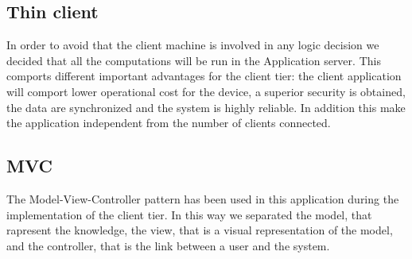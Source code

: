\subsection{Thin client}
	In order to avoid that the client machine is involved in any logic decision we decided that all the computations will be run in the Application server. This comports different important advantages for the client tier: the client application will comport lower operational cost for the device, a superior security is obtained, the data are synchronized and the system is highly reliable. In addition this make the application independent from the number of clients connected.
\subsection{MVC}
	The Model-View-Controller pattern has been used in this application during the implementation of the client tier. In this way we separated the model, that rapresent the knowledge, the view, that is a visual representation of the model, and the controller, that is the link between a user and the system.
